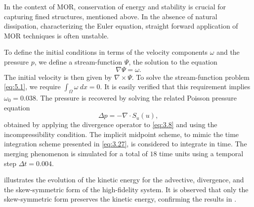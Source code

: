 In the context of MOR, conservation of energy and stability is crucial for capturing fined structures, mentioned above. In the absence of natural dissipation, characterizing the Euler equation, straight forward application of MOR techniques is often unstable.

To define the initial conditions in terms of the velocity components $\omega$ and the pressure $p$, we define a stream-function $\Psi$, the solution to the equation 
\begin{equation} \label{eq:5.1}
	\nabla \Psi = \omega.
\end{equation}
The initial velocity is then given by $\nabla \times \Psi$. To solve the stream-function problem \eqref{eq:5.1}, we require $\int_{\Omega} \omega \ dx= 0$. It is easily verified that this requirement implies $\omega_0 = 0.038$. The pressure is recovered by solving the related Poisson pressure equation 
\begin{equation*}
\Delta p = - \nabla \cdot S_{u}(u),
\end{equation*}
obtained by applying the divergence operator to \eqref{eq:3.8} and using the incompressibility condition.
 The implicit midpoint scheme, to mimic the time integration scheme presented in \eqref{eq:3.27}, is considered to integrate in time. The merging phenomenon is simulated for a total of $18$ time units using a temporal step $\Delta t=0.004$.

 illustrates the evolution of the kinetic energy for the advective, divergence, and the skew-symmetric form of the high-fidelity system. It is observed that only the skew-symmetric form preserves the kinetic energy, confirming the results in .

